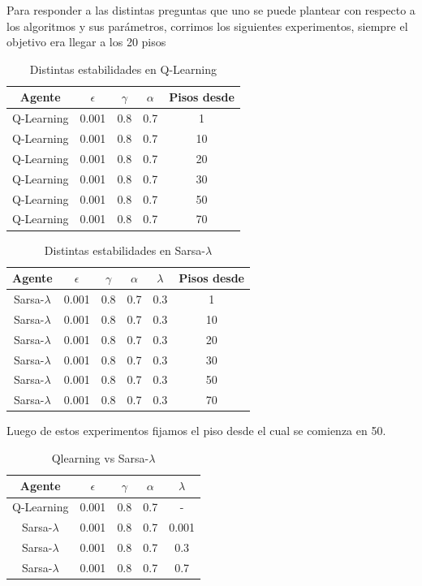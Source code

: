 \documentclass[11pt, a4paper]{article}
\newcommand{\slambda}{Sarsa-$\lambda$ }
\begin{document}
Para responder a las distintas preguntas que uno se puede plantear con respecto a los algoritmos y sus par\'ametros, corrimos los siguientes experimentos, siempre el objetivo era llegar a los 20 pisos

\bigskip

\begin{table}[h!]
\center
\begin{tabular}{ | c | c | c | c | c| }
  \hline
  Agente & $\epsilon$ & $\gamma$ & $\alpha$ & Pisos desde \\
  \hline 
 	 Q-Learning  & 0.001  & 0.8  & 0.7 & 1 \\
	Q-Learning  & 0.001  & 0.8  & 0.7 &  10\\
	Q-Learning  & 0.001  & 0.8  & 0.7 &  20 \\
	Q-Learning  & 0.001  & 0.8  & 0.7 &  30\\
	Q-Learning  & 0.001  & 0.8  & 0.7 &  50\\
	Q-Learning  & 0.001  & 0.8  & 0.7 &  70\\
  \hline

\end{tabular}
\caption {Distintas estabilidades en Q-Learning}
\end{table}

\begin{table}[h!]
\center
\begin{tabular}{ | c | c | c | c | c | c | }
  \hline
  Agente & $\epsilon$ & $\gamma$ & $\alpha$ & $\lambda$ & Pisos desde \\
  \hline 
 	 \slambda  & 0.001  & 0.8  & 0.7 & 0.3 & 1 \\
	\slambda  & 0.001  & 0.8  & 0.7 &  0.3& 10 \\
	\slambda  & 0.001  & 0.8  & 0.7 &  0.3& 20  \\
	\slambda  & 0.001  & 0.8  & 0.7 &  0.3& 30 \\
	\slambda  & 0.001  & 0.8  & 0.7 &  0.3& 50 \\
	\slambda  & 0.001  & 0.8  & 0.7 &  0.3& 70 \\
  \hline

\end{tabular}
\caption {Distintas estabilidades en \slambda}
\end{table}

Luego de estos experimentos fijamos el piso desde el cual se comienza en 50.

\begin{table}[h!]
\center
\begin{tabular}{ | c | c | c | c | c| }
  \hline
  Agente & $\epsilon$ & $\gamma$ & $\alpha$ & $\lambda$ \\
  \hline 
 	 Q-Learning  & 0.001  & 0.8  & 0.7 & - \\
	\slambda & 0.001  & 0.8  & 0.7 & 0.001 \\
	\slambda & 0.001  & 0.8  & 0.7 & 0.3 \\
	\slambda  & 0.001  & 0.8  & 0.7 & 0.7\\
  \hline

\end{tabular}
\caption {Qlearning vs \slambda}
\end{table}
\end{document}
